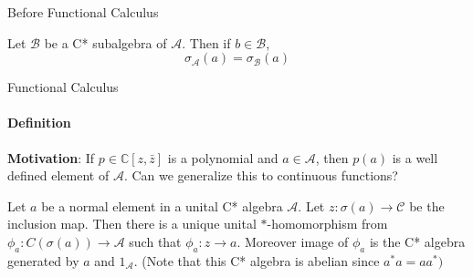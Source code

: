 \documentclass[handout, dvipsnames]{beamer}
\newcommand{\1}{\mathds{1}}	%
\begin{document}
%
%

\begin{frame}{Before Functional Calculus}
  \begin{lemma}
    Let $\mathcal{B}$ be a C* subalgebra of $\mathcal{A}$. Then if $b \in \mathcal{B}$, $$\sigma_{\mathcal{A}}(a) = \sigma_{\mathcal{B}}(a)$$ 
  \end{lemma}
\end{frame}

\begin{frame}{Functional Calculus}
  \framesubtitle{Definition}
  \textbf{Motivation}: If $p \in \mathbb{C}[z, \bar{z}]$ is a polynomial and $a \in \mathcal{A}$, then $p(a)$ is a well defined element of $\mathcal{A}$. Can we generalize this to continuous functions?
  \pause
  \begin{theorem}
    Let $a$ be a normal element in a unital C* algebra $\mathcal{A}$. Let $z: \sigma(a) \to \mathcal{C}$ be the inclusion map. Then there is a unique unital $*$-homomorphism from $\phi_a: C(\sigma(a)) \to \mathcal{A}$ such that $\phi_a: z \to a$. \pause Moreover image of $\phi_a$ is the C* algebra generated by $a$ and $1_\mathcal{A}$. (Note that this C* algebra is abelian since $a^*a = aa^*)$
  \end{theorem}
\end{frame}
\end{document}
